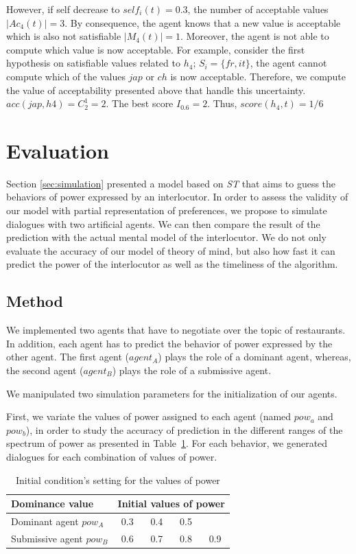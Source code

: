\documentclass[conference, letterpaper]{IEEEtran}
\begin{document}
		However, if self decrease to $self_i(t)=0.3$, the number of acceptable values $|Ac_4(t)| = 3$. By consequence, the agent knows that a new value is acceptable which is also not satisfiable $|M_4(t)|=1$. 
		Moreover, the agent is not able to compute which value is now acceptable. For example, consider the first hypothesis on satisfiable values related to $h_4$; $S_i = \{fr, it\}$, the agent cannot compute which of the values $jap$ or $ch$ is now acceptable. Therefore, we compute the value of acceptability presented above that handle this uncertainty. 
		$ acc(jap, h4) = C^1_2 = 2$. The best score $I_{0.6}=2$. Thus, $score(h_4,t)= 1/6$
	

	
	\section{Evaluation}
	Section \ref{sec:simulation} presented a model based on \emph{ST} that aims to guess the behaviors of power expressed by an interlocutor. In order to assess the validity of our model with partial representation of preferences, we propose to simulate dialogues with two artificial agents. We can then compare the result of the prediction with the actual mental model of the interlocutor. We do not only evaluate the accuracy of our model of theory of mind, but also how fast it can predict the power of the interlocutor as well as the timeliness of the algorithm.
	
	\subsection{Method}
	We implemented two agents that have to negotiate over the topic of restaurants. In addition, each agent has to predict the behavior of power expressed by the other agent. 
	The first agent ($agent_A$) plays the role of a dominant agent, whereas, the second agent ($agent_B$) plays the role of a submissive agent.
	
	We manipulated two simulation parameters for the initialization of our agents.
	
	First, we variate the values of power assigned to each agent (named \emph{$pow_a$} and \emph{$pow_b$}), in order to study the accuracy of prediction in the different ranges of the spectrum of power as presented in Table~\ref{tab:powsettings}. For each behavior, we generated dialogues for each combination of values of power. 
	\begin{table}[h]
		\centering
		\caption{Initial condition's setting for the values of power} 
		\begin{tabular}{|l|cccc|}
			\hline 
			\textbf{Dominance value } &	\multicolumn{4}{c|}{ Initial values of power } \\
			\hline
			Dominant agent $pow_A$ & 0.3 & 0.4 & 0.5 &  \\
			\hline
			Submissive agent $pow_B$ & 0.6 & 0.7 & 0.8 & 0.9\\
			\hline
		\end{tabular}
		
		\label{tab:powsettings}
	\end{table}
	
\end{document}
